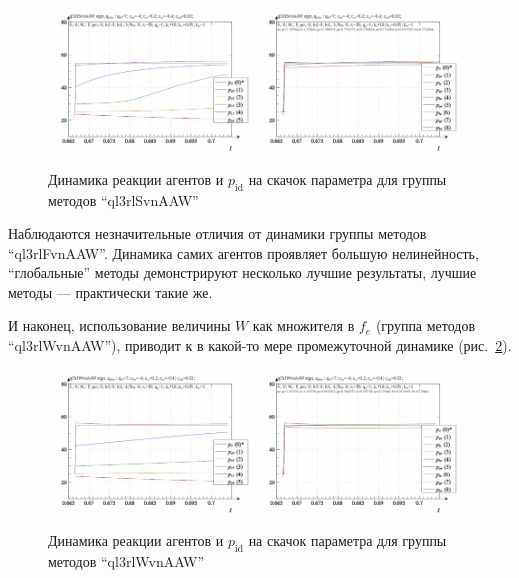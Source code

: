 \begin{figure}[htb!]
  \centerline{
    \includegraphics[width=0.48\textwidth]{p/sign/qls-p_t_pi_m_ql3rlSvnAAW_sign.png}
    \hfill
    \includegraphics[width=0.48\textwidth]{p/sign/qls-p_t_p_m_ql3rlSvnAAW_sign.png}
  }
  \caption{Динамика реакции агентов и $p_\mathrm{id}$ на скачок параметра для группы методов ``ql3rlSvnAAW''}
  \label{atu:f:ql3rlSvnAAW_sign}
\end{figure}

Наблюдаются незначительные отличия от динамики группы методов ``ql3rlFvnAAW''.
Динамика самих агентов проявляет большую нелинейность,
``глобальные'' методы демонстрируют несколько лучшие результаты,
лучшие методы --- практически такие же.

И наконец, использование величины $W$ как множителя в $f_e$
(группа методов ``ql3rlWvnAAW''), приводит к в какой-то мере
промежуточной динамике
(рис.~\ref{atu:f:ql3rlWvnAAW_sign}).

\begin{figure}[htb!]
  \centerline{
    \includegraphics[width=0.48\textwidth]{p/sign/qls-p_t_pi_m_ql3rlWvnAAW_sign.png}
    \hfill
    \includegraphics[width=0.48\textwidth]{p/sign/qls-p_t_p_m_ql3rlWvnAAW_sign.png}
  }
  \caption{Динамика реакции агентов и $p_\mathrm{id}$ на скачок параметра для группы методов ``ql3rlWvnAAW''}
  \label{atu:f:ql3rlWvnAAW_sign}
\end{figure}

